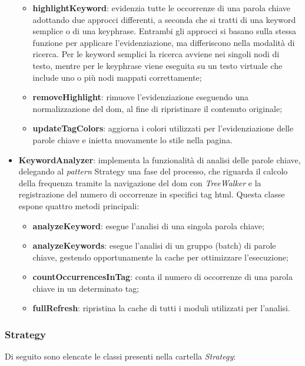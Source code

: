 \begin{itemize}
\begin{itemize}
    \item \textbf{highlightKeyword}: evidenzia tutte le occorrenze di una parola chiave adottando due approcci differenti, a seconda che si tratti di una keyword semplice o di una keyphrase. Entrambi gli approcci si basano sulla stessa funzione per applicare l’evidenziazione, ma differiscono nella modalità di ricerca. Per le keyword semplici la ricerca avviene nei singoli nodi di testo, mentre per le keyphrase viene eseguita su un testo virtuale che include uno o più nodi mappati correttamente;
    \item \textbf{removeHighlight}: rimuove l’evidenziazione eseguendo una normalizzazione del \gls{dom}, al fine di ripristinare il contenuto originale;
    \item \textbf{updateTagColors}: aggiorna i colori utilizzati per l’evidenziazione delle parole chiave e inietta nuovamente lo stile nella pagina.
  \end{itemize}
  \item \textbf{KeywordAnalyzer}: implementa la funzionalità di analisi delle parole chiave, delegando al \textit{pattern} Strategy una fase del processo, che riguarda il calcolo della frequenza tramite la navigazione del \gls{dom} con \textit{TreeWalker} e la registrazione del numero di occorrenze in specifici tag \gls{html}. Questa classe espone quattro metodi principali:
  \begin{itemize}
    \item \textbf{analyzeKeyword}: esegue l’analisi di una singola parola chiave;
    \item \textbf{analyzeKeywords}: esegue l’analisi di un gruppo (batch) di parole chiave, gestendo opportunamente la cache per ottimizzare l’esecuzione;
    \item \textbf{countOccurrencesInTag}: conta il numero di occorrenze di una parola chiave in un determinato tag;
    \item \textbf{fullRefresh}: ripristina la cache di tutti i moduli utilizzati per l’analisi.
  \end{itemize}
\end{itemize}

\subsubsection{Strategy}

\par Di seguito sono elencate le classi presenti nella cartella \textit{Strategy}:

